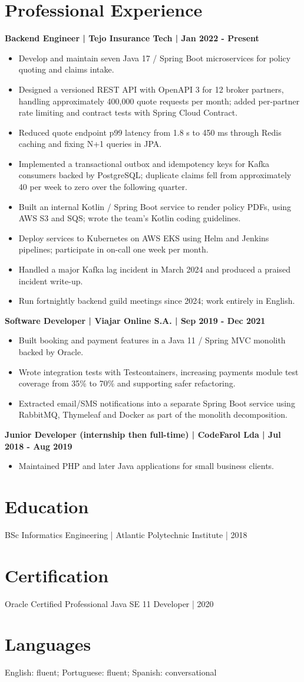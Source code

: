 \documentclass[11pt,a4paper]{article}
\newcommand{\cvsection}[1]{\section*{#1}}
\newcommand{\cvrole}[1]{\Needspace{5\baselineskip}\par\medskip\noindent\textbf{#1}\par}
\begin{document}
\cvsection{Professional Experience}
\cvrole{Backend Engineer | Tejo Insurance Tech | Jan 2022 - Present}
\begin{itemize}
\item Develop and maintain seven Java 17 / Spring Boot microservices for policy quoting and claims intake.
\item Designed a versioned REST API with OpenAPI 3 for 12 broker partners, handling approximately 400,000 quote requests per month; added per-partner rate limiting and contract tests with Spring Cloud Contract.
\item Reduced quote endpoint p99 latency from 1.8 s to 450 ms through Redis caching and fixing N+1 queries in JPA.
\item Implemented a transactional outbox and idempotency keys for Kafka consumers backed by PostgreSQL; duplicate claims fell from approximately 40 per week to zero over the following quarter.
\item Built an internal Kotlin / Spring Boot service to render policy PDFs, using AWS S3 and SQS; wrote the team's Kotlin coding guidelines.
\item Deploy services to Kubernetes on AWS EKS using Helm and Jenkins pipelines; participate in on-call one week per month.
\item Handled a major Kafka lag incident in March 2024 and produced a praised incident write-up.
\item Run fortnightly backend guild meetings since 2024; work entirely in English.
\end{itemize}

\cvrole{Software Developer | Viajar Online S.A. | Sep 2019 - Dec 2021}
\begin{itemize}
\item Built booking and payment features in a Java 11 / Spring MVC monolith backed by Oracle.
\item Wrote integration tests with Testcontainers, increasing payments module test coverage from 35\% to 70\% and supporting safer refactoring.
\item Extracted email/SMS notifications into a separate Spring Boot service using RabbitMQ, Thymeleaf and Docker as part of the monolith decomposition.
\end{itemize}

\cvrole{Junior Developer (internship then full-time) | CodeFarol Lda | Jul 2018 - Aug 2019}
\begin{itemize}
\item Maintained PHP and later Java applications for small business clients.
\end{itemize}

\cvsection{Education}
BSc Informatics Engineering | Atlantic Polytechnic Institute | 2018

\cvsection{Certification}
Oracle Certified Professional Java SE 11 Developer | 2020

\cvsection{Languages}
English: fluent; Portuguese: fluent; Spanish: conversational
\end{document}
